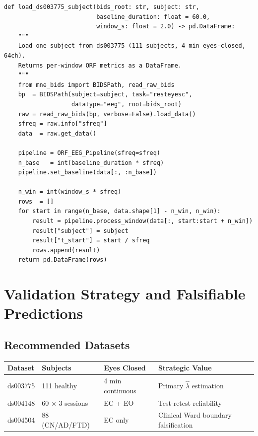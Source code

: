 \documentclass[12pt,a4paper]{article}
\theoremstyle{definition}
\newcommand{\lhat}{\hat{\lambda}}
\begin{document}
\begin{lstlisting}[style=orfpython,caption={One-command dataset runner for OpenNeuro ds003775}]
def load_ds003775_subject(bids_root: str, subject: str,
                          baseline_duration: float = 60.0,
                          window_s: float = 2.0) -> pd.DataFrame:
    """
    Load one subject from ds003775 (111 subjects, 4 min eyes-closed, 64ch).
    Returns per-window ORF metrics as a DataFrame.
    """
    from mne_bids import BIDSPath, read_raw_bids
    bp  = BIDSPath(subject=subject, task="resteyesc",
                   datatype="eeg", root=bids_root)
    raw = read_raw_bids(bp, verbose=False).load_data()
    sfreq = raw.info["sfreq"]
    data  = raw.get_data()

    pipeline = ORF_EEG_Pipeline(sfreq=sfreq)
    n_base   = int(baseline_duration * sfreq)
    pipeline.set_baseline(data[:, :n_base])

    n_win = int(window_s * sfreq)
    rows  = []
    for start in range(n_base, data.shape[1] - n_win, n_win):
        result = pipeline.process_window(data[:, start:start + n_win])
        result["subject"] = subject
        result["t_start"] = start / sfreq
        rows.append(result)
    return pd.DataFrame(rows)
\end{lstlisting}

\section{Validation Strategy and Falsifiable Predictions}

\subsection{Recommended Datasets}

\begin{longtable}{@{}p{3cm}p{3cm}p{2.5cm}p{5cm}@{}}
  \toprule
  \textbf{Dataset} & \textbf{Subjects} & \textbf{Eyes Closed} &
  \textbf{Strategic Value} \\
  \midrule
  ds003775 & 111 healthy & 4 min continuous & Primary $\lhat$ estimation \\
  ds004148 & 60 × 3 sessions & EC + EO & Test-retest reliability \\
  ds004504 & 88 (CN/AD/FTD) & EC only & Clinical Ward boundary falsification \\
  \bottomrule
\end{longtable}
\end{document}
